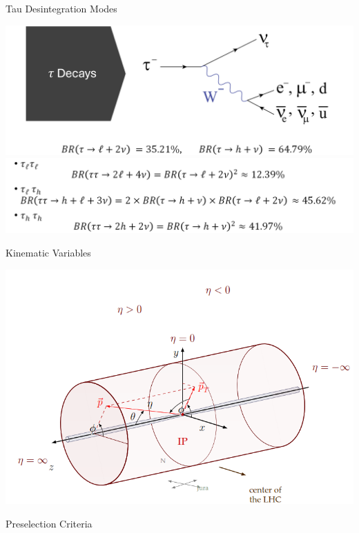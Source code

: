 \documentclass{../bredelebeamer}
\begin{document}
\begin{frame}{Tau Desintegration Modes}
	\begin{center}
		\includegraphics[width=.99\linewidth]{tau_decays.png}
		$$ $$\pause
		\includegraphics[width=.99\linewidth]{tau_decays2.png}
	\end{center}
\end{frame}

\begin{frame}{Kinematic Variables}
	\begin{center}
		\includegraphics[width=.99\linewidth]{Kinematic_Variables.png}
	\end{center}
\end{frame}

\begin{frame}{Preselection Criteria}
	\begin{center}
		\large
		
	\end{center}
\end{frame}
\end{document}
